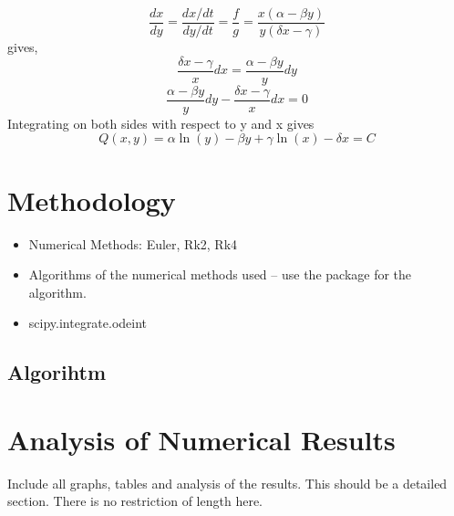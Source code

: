 \documentclass[12pt]{article}
\begin{document}
\begin{equation*}
    \frac { d x } { d y } = \frac { d x / d t } { d y / d t } = \frac { f } { g } = \frac  { x(\alpha  - \beta  y)} { y(\delta x  - \gamma )}
\end{equation*}
gives,
\begin{equation*}
    \frac { \delta x - \gamma}{x}  d x = \frac  {\alpha - \beta y }{ y } d y
\end{equation*}
\begin{equation*}
     \frac  {\alpha - \beta y }{ y } d y - \frac { \delta x - \gamma}{x}  d x = 0
\end{equation*}
Integrating on both sides with respect to y and x gives
\begin{equation*}
      Q(x,y) = \alpha \ln ( y ) - \beta y + \gamma \ln ( x ) - \delta x   = C
\end{equation*}


\section{Methodology}
\label{sec:method}
\begin{itemize}
    \item Numerical Methods: Euler, Rk2, Rk4 
    \item Algorithms of the numerical methods used -- use the package for the algorithm.
    \item scipy.integrate.odeint \cite{noauthor_scipyintegrateodeint_nodate}
\end{itemize}
\subsection{Algorihtm}


\newpage
\section{Analysis of Numerical Results}
Include all graphs, tables and analysis of the results. This should be a detailed section. There is no restriction of length here.
\end{document}
